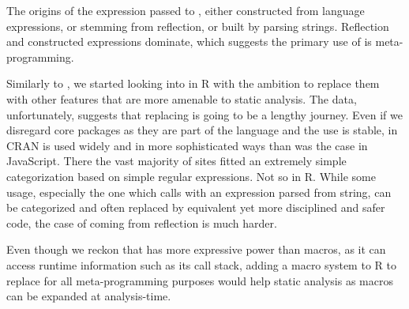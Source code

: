 \documentclass[review,screen,acmsmall,anonymous=true]{acmart}
\begin{document}
The origins of the expression passed to \eval, either constructed from language expressions, or stemming from reflection, or built by parsing strings. Reflection and constructed expressions dominate, which suggests the primary   use of \eval is meta-programming. %

Similarly to \citep{ecoop11}, we started looking into \evals in R with the
ambition to replace them with other features that are more amenable to static
analysis. The data, unfortunately, suggests that replacing \eval is going to be
a lengthy journey. Even if we disregard core packages as they are part of the
language and the \eval use is stable, in CRAN \eval is used widely and in more
sophisticated ways than was the case in JavaScript. There the vast majority of
sites fitted an extremely simple categorization based on simple regular
expressions. Not so in R. While some usage, especially the one which calls
\eval with an expression parsed from string, can be categorized and often
replaced by equivalent yet more disciplined and safer code, the case of \eval
coming from reflection is much harder.

Even though we reckon that \eval has more expressive power than macros, as it can access runtime information such as its call stack, adding a macro system to R to replace \eval for all meta-programming purposes would help static analysis as macros can be expanded at analysis-time.



\end{document}

